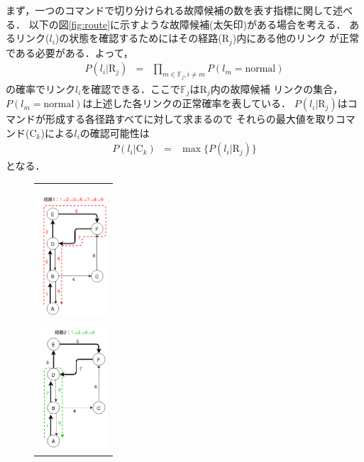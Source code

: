 \documentclass[11pt]{jsarticle}%
\begin{document}
\begin{multicols}{2}
 まず，一つのコマンドで切り分けられる故障候補の数を表す指標に関して述べる．
 以下の図\ref{fig:route}に示すような故障候補(太矢印)がある場合を考える．
 あるリンク($l_i$)の状態を確認するためにはその経路($\text{R}_j$)内にある他のリンク
 が正常である必要がある．よって，
 \begin{eqnarray}
  P(l_{i} | \text{R}_j) &=& \prod_{m\in\mathbb{F}_j,i\neq m} P(l_{m} = \text{normal})
 \end{eqnarray}
 の確率でリンク$l_i$を確認できる．ここで$\mathbb{F}_j$は$\text{R}_j$内の故障候補
 リンクの集合，$P(l_{m} = \text{normal})$は上述した各リンクの正常確率を表している．
 $P(l_{i} | \text{R}_j)$はコマンドが形成する各径路すべてに対して求まるので
 それらの最大値を取りコマンド(C$_k$)による$l_i$の確認可能性は
\begin{eqnarray}
  P(l_i|\text{C}_k) &=& \max  \{ P(l_i|\text{R}_{j})\}
\end{eqnarray}
となる．
 \begin{figure}[H]
  \centering
     \begin{tabular}{c}
        \begin{minipage}{0.30\hsize}
        \centering
        \includegraphics[height=4.5cm]{../figure/route1.png}
           \label{fig:route1}
        \end{minipage}
        \begin{minipage}{0.30\hsize}
        \centering
        \includegraphics[height=4.5cm]{../figure/route2.png}

\end{minipage}
\end{tabular}
\end{figure}
\end{multicols}
\end{document}
